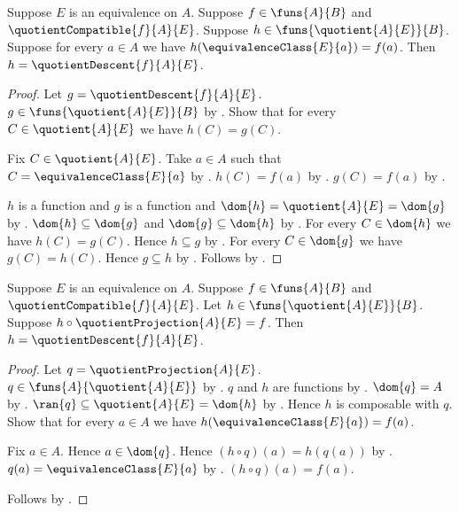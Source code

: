 \begin{theorem}\label{quotient_descent_unique}
    Suppose $E$ is an equivalence on $A$.
    Suppose $f\in\funs{A}{B}$ and $\quotientCompatible{f}{A}{E}$.
    Suppose $h\in\funs{\quotient{A}{E}}{B}$.
    Suppose for every $a\in A$ we have
        $h(\equivalenceClass{E}{a})=f(a)$.
    Then $h=\quotientDescent{f}{A}{E}$.
\end{theorem}
\begin{proof}
    Let $g=\quotientDescent{f}{A}{E}$.
    $g\in\funs{\quotient{A}{E}}{B}$ by
        .
    Show that for every $C\in\quotient{A}{E}$ we have $h(C)=g(C)$.
    \begin{subproof}
        Fix $C\in\quotient{A}{E}$.
        Take $a\in A$ such that $C=\equivalenceClass{E}{a}$ by
            .
        $h(C)=f(a)$ by \auto.
        $g(C)=f(a)$ by .
    \end{subproof}
    $h$ is a function and $g$ is a function and
        $\dom{h}=\quotient{A}{E}=\dom{g}$ by
        .
    $\dom{h}\subseteq\dom{g}$ and $\dom{g}\subseteq\dom{h}$ by
        .
    For every $C\in\dom{h}$ we have $h(C)=g(C)$.
    Hence $h\subseteq g$ by .
    For every $C\in\dom{g}$ we have $g(C)=h(C)$.
    Hence $g\subseteq h$ by .
    Follows by .
\end{proof}

\begin{theorem}\label{quotient_descent_unique_factorization}
    Suppose $E$ is an equivalence on $A$.
    Suppose $f\in\funs{A}{B}$ and $\quotientCompatible{f}{A}{E}$.
    Let $h\in\funs{\quotient{A}{E}}{B}$.
    Suppose $h\circ\quotientProjection{A}{E}=f$.
    Then $h=\quotientDescent{f}{A}{E}$.
\end{theorem}
\begin{proof}
    Let $q=\quotientProjection{A}{E}$.
    $q\in\funs{A}{\quotient{A}{E}}$ by
        .
    $q$ and $h$ are functions by .
    $\dom{q}=A$ by .
    $\ran{q}\subseteq\quotient{A}{E}=\dom{h}$ by
        .
    Hence $h$ is composable with $q$.
    Show that for every $a\in A$ we have
        $h(\equivalenceClass{E}{a})=f(a)$.
    \begin{subproof}
        Fix $a\in A$.
        Hence $a\in\dom{q}$.
        Hence $(h\circ q)(a)=h(q(a))$ by .
        $q(a)=\equivalenceClass{E}{a}$ by
            .
        $(h\circ q)(a)=f(a)$.
    \end{subproof}
    Follows by .
\end{proof}

